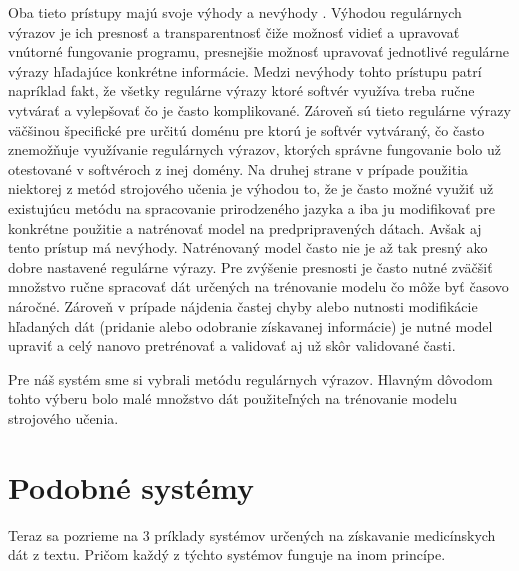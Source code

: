 Oba tieto prístupy majú svoje výhody a nevýhody \cite{nlpAndRegex}. 
Výhodou regulárnych výrazov je ich presnosť a 
transparentnosť čiže možnosť vidieť a upravovať
vnútorné fungovanie programu, presnejšie možnosť 
upravovať jednotlivé regulárne výrazy
hľadajúce konkrétne informácie. Medzi nevýhody tohto prístupu patrí
napríklad fakt, že všetky regulárne výrazy ktoré softvér využíva 
treba ručne vytvárať a vylepšovať
čo je často komplikované. Zároveň sú tieto regulárne výrazy väčšinou špecifické pre určitú doménu
pre ktorú je softvér vytváraný, čo často znemožňuje využívanie
regulárnych výrazov, ktorých správne fungovanie bolo už 
otestované v softvéroch z inej domény.  
Na druhej strane v prípade použitia niektorej
z metód strojového učenia je výhodou to, že je často možné využiť už 
existujúcu metódu na spracovanie prirodzeného jazyka a iba ju
modifikovať pre konkrétne použitie a natrénovať
model na predpripravených dátach. Avšak aj tento prístup
má nevýhody. Natrénovaný model často nie je až tak presný 
ako dobre nastavené regulárne výrazy. Pre zvýšenie presnosti je často nutné zväčšiť množstvo ručne spracovať dát určených na trénovanie modelu čo môže byť časovo náročné. Zároveň v prípade nájdenia častej chyby alebo nutnosti modifikácie hľadaných dát (pridanie alebo odobranie získavanej informácie) je nutné model upraviť a celý nanovo pretrénovať a validovať aj už skôr validované časti.

Pre náš systém sme si vybrali metódu regulárnych výrazov. Hlavným dôvodom tohto výberu bolo malé množstvo dát použiteľných na trénovanie modelu strojového učenia. 

\section{Podobné systémy}

Teraz sa pozrieme na 3 príklady systémov určených na získavanie medicínskych dát z textu. Pričom každý z týchto systémov funguje na inom princípe.

